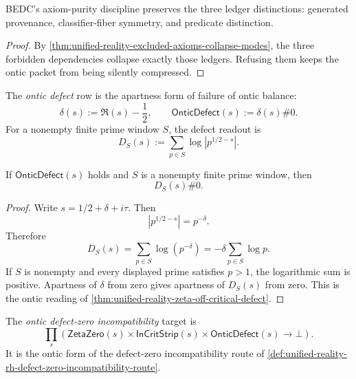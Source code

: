 \begin{corollary}
\label{cor:unified-reality-axiom-purity-protects-ontic-ledgers}
BEDC's axiom-purity discipline preserves the three ledger distinctions:
generated provenance, classifier-fiber symmetry, and predicate
distinction.
\end{corollary}

\begin{proof}
By
\autoref{thm:unified-reality-excluded-axioms-collapse-modes}, the three
forbidden dependencies collapse exactly those ledgers. Refusing them
keeps the ontic packet from being silently compressed.
\end{proof}

\begin{definition}
\label{def:unified-reality-ontic-defect}
The \emph{ontic defect} row is the apartness form of failure of ontic
balance:
$$
\delta(s):=\Re(s)-\frac12,
\qquad
\mathsf{OnticDefect}(s):=\delta(s)\#0.
$$
For a nonempty finite prime window $S$, the defect readout is
$$
D_S(s):=\sum_{p\in S}\log|p^{1/2-s}|.
$$
\end{definition}

\begin{theorem}
\label{thm:unified-reality-ontic-defect-visible-prime-window}
If $\mathsf{OnticDefect}(s)$ holds and $S$ is a nonempty finite prime
window, then
$$
D_S(s)\#0.
$$
\end{theorem}

\begin{proof}
Write $s=1/2+\delta+i\tau$. Then
$$
|p^{1/2-s}|=p^{-\delta}.
$$
Therefore
$$
D_S(s)
=
\sum_{p\in S}\log(p^{-\delta})
=
-\delta\sum_{p\in S}\log p.
$$
If $S$ is nonempty and every displayed prime satisfies $p>1$, the
logarithmic sum is positive. Apartness of $\delta$ from zero gives
apartness of $D_S(s)$ from zero. This is the ontic reading of
\autoref{thm:unified-reality-zeta-off-critical-defect}.
\end{proof}

\begin{definition}
\label{def:unified-reality-ontic-defect-zero-incompatibility}
The \emph{ontic defect-zero incompatibility} target is
$$
\prod_s
\left(
\mathsf{ZetaZero}(s)\times
\mathsf{InCritStrip}(s)\times
\mathsf{OnticDefect}(s)
\to
\bot
\right).
$$
It is the ontic form of the defect-zero incompatibility route of
\autoref{def:unified-reality-rh-defect-zero-incompatibility-route}.
\end{definition}

